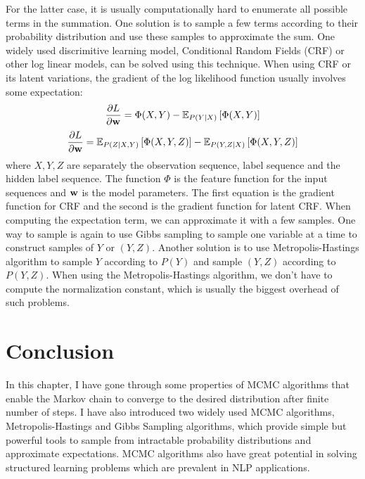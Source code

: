 For the latter case, it is usually computationally hard to enumerate all possible terms in the summation. One solution is to sample a few terms according to their probability distribution and use these samples to approximate the sum. 
One widely used discrimitive learning model, Conditional Random Fields (CRF) or other log linear models, can be solved using this technique. When using CRF or its latent variations, the 
gradient of the log likelihood function usually involves some expectation:
$$\frac{\partial{L}}{\partial{{\bf w}}}= \Phi(X, Y) - \mathbb{E}_{P(Y|X)} \left[\Phi(X,Y)\right]$$
$$\frac{\partial{L}}{\partial{{\bf w}}}= \mathbb{E}_{P(Z|X, Y)}\left[\Phi(X, Y, Z)\right] - \mathbb{E}_{P(Y, Z|X)} \left[\Phi(X,Y,Z)\right]$$
where $X, Y, Z$ are separately the observation sequence, label sequence and the hidden label sequence. The function $\Phi$ is the feature function for the input sequences and ${\bf w}$ is the model parameters. The first equation is the gradient function for CRF and the second is the gradient function for latent CRF. When computing the expectation term, we can approximate it with a few samples. One way to
sample is again to use Gibbs sampling to sample one variable at a time to construct samples of $Y$ or $(Y, Z)$. Another solution is to
use Metropolis-Hastings algorithm to sample $Y$ according to $P(Y)$ and sample $(Y, Z)$ according to $P(Y, Z)$. When using the Metropolis-Hastings algorithm, we don't have to compute the normalization constant, which is usually the biggest overhead of such problems.
\section{Conclusion}
In this chapter, I have gone through some properties of MCMC algorithms that enable the Markov chain to converge to the desired distribution after
finite number of steps. I have also introduced two widely used MCMC algorithms, Metropolis-Hastings and Gibbs Sampling algorithms, which provide simple but powerful tools to sample from intractable probability distributions and approximate expectations.
MCMC algorithms also have great potential in solving structured learning problems which are prevalent in NLP applications.
